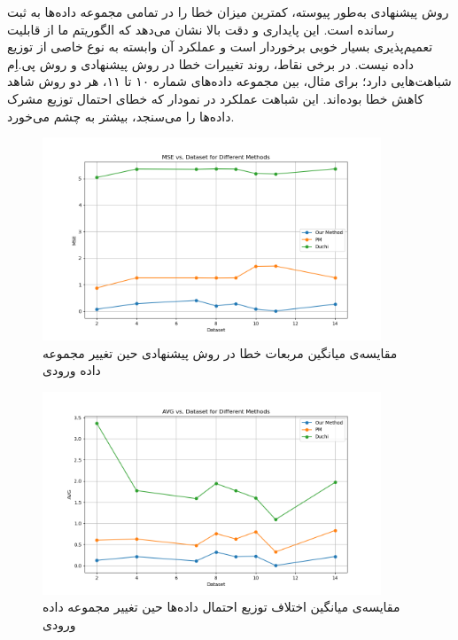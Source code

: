 روش پیشنهادی به‌طور پیوسته، کمترین میزان خطا را در تمامی مجموعه داده‌ها به ثبت رسانده است. این پایداری و دقت بالا نشان می‌دهد که الگوریتم ما از قابلیت تعمیم‌پذیری بسیار خوبی برخوردار است و عملکرد آن وابسته به نوع خاصی از توزیع داده نیست. در برخی نقاط، روند تغییرات خطا در روش پیشنهادی و روش پی.اِم شباهت‌هایی دارد؛ برای مثال، بین مجموعه‌ داده‌های شماره ۱۰ تا ۱۱، هر دو روش شاهد کاهش خطا بوده‌اند. این شباهت عملکرد در نمودار  که خطای احتمال توزیع مشرک داده‌ها را می‌سنجد، بیشتر به چشم می‌خورد.

\begin{figure}[h]
  \centering
  \includegraphics[width=0.9\textwidth]{figs/evaluation_dst_mse.png}
  \caption{مقایسه‌ی میانگین مربعات خطا در روش پیشنهادی حین تغییر مجموعه داده ورودی}
  \label{fig:dst_mse}
\end{figure}

\vspace{5pt}

\begin{figure}[h]
  \centering
  \includegraphics[width=0.9\textwidth]{figs/evaluation_dst_avg.png}
  \caption{مقایسه‌ی میانگین اختلاف توزیع احتمال داده‌ها حین تغییر مجموعه داده ورودی}
  \label{fig:dst_avg}
\end{figure}

